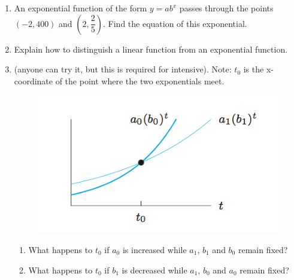\documentclass[12pt]{article}
\theoremstyle{plain}     %
\begin{document}
\begin{enumerate}
	\item An exponential function of the form $y=ab^x$ passes through the points $\left(-2,400\right)$ and $\left(2,\dfrac{2}{5}\right)$. Find the equation of this exponential.
	\item Explain how to distinguish a linear function from an exponential function.
	\item (anyone can try it, but this is required for intensive). Note: $t_0$ is the x-coordinate of the point where the two exponentials meet.\\
	\begin{figure}[H]
		\includegraphics[scale=.5]{1.png}
	\end{figure}
		\begin{enumerate}
			\item What happens to $t_0$ if $a_0$ is increased while $a_1$, $b_1$ and $b_0$ remain fixed?
			\item What happens to $t_0$ if $b_1$ is decreased while $a_1$, $b_0$ and $a_0$ remain fixed?
		\end{enumerate}

\end{enumerate}
	
\end{document}
